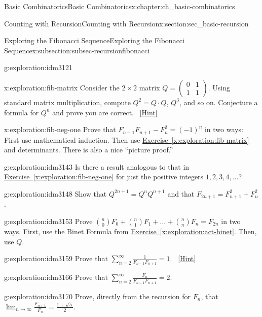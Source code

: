 \documentclass[oneside,10pt,]{book}
\numberwithin{equation}{chapter}
\newcommand{\amp}{&}
\begin{document}
\begin{chapterptx}{Basic Combinatorics}{}{Basic Combinatorics}{}{}{x:chapter:ch_basic-combinatorics}
\begin{sectionptx}{Counting with Recursion}{}{Counting with Recursion}{}{}{x:section:sec_basic-recursion}
\begin{subsectionptx}{Exploring the Fibonacci Sequence}{}{Exploring the Fibonacci Sequence}{}{}{x:subsection:subsec-recursionfibonacci}
\begin{exploration}{}{g:exploration:idm3121}
\end{exploration}
\begin{exploration}{}{x:exploration:fib-matrix}%
Consider the \(2\times 2\) matrix \(Q =
\begin{pmatrix}
0 \amp 1\\
1 \amp 1
\end{pmatrix}.\) Using standard matrix multiplication, compute \(Q^2 = Q\cdot Q\), \(Q^3\), and so on.  Conjecture a formula for \(Q^n\) and prove you are correct.%
\qquad~\hfill{\tiny\hyperlink{g:hint:idm3134-back}{[Hint]}}\end{exploration}
\begin{exploration}{}{x:exploration:fib-neg-one}%
Prove that \(F_{n - 1}F_{n + 1} - F_{n}^{2} = (-1)^{n}\) in two ways:  First use mathematical induction.  Then use \hyperref[x:exploration:fib-matrix]{Exercise~\ref{x:exploration:fib-matrix}} and determinants.  There is also a nice ``picture proof.''%
\end{exploration}
\begin{exploration}{}{g:exploration:idm3143}%
Is there a result analogous to that in \hyperref[x:exploration:fib-neg-one]{Exercise~\ref{x:exploration:fib-neg-one}} for just the positive integers \(1, 2, 3, 4, \ldots\)?%
\end{exploration}
\begin{exploration}{}{g:exploration:idm3148}%
Show that \(Q^{2n + 1} = Q^{n}Q^{n+1}\) and that \(F_{2n + 1} = F_{n + 1}^{2} + F_{n}^{2}\) .%
\end{exploration}
\begin{exploration}{}{g:exploration:idm3153}%
Prove \(\binom{n}{0}F_{0} + \binom{n}{1}F_{1} + \ldots + \binom{n}{n}F_{n} = F_{2n}\) in two ways.  First, use the Binet Formula from \hyperref[x:exploration:act-binet]{Exercise~\ref{x:exploration:act-binet}}.  Then, use \(Q\).%
\end{exploration}
\begin{exploration}{}{g:exploration:idm3159}%
Prove that \(\sum_{n = 2}^{\infty}\frac{1}{F_{n - 1}F_{n + 1}} = 1\).%
\qquad~\hfill{\tiny\hyperlink{g:hint:idm3163-back}{[Hint]}}\end{exploration}
\begin{exploration}{}{g:exploration:idm3166}%
Prove that \(\sum_{n = 2}^{\infty}\frac{F_{n}}{F_{n - 1}F_{n + 1}} = 2.\)%
\end{exploration}
\begin{exploration}{}{g:exploration:idm3170}%
Prove, directly from the recursion for \(F_n\), that \(\lim_{n\to\infty}\frac{F_{n + 1}}{F_{n}} = \frac{1 + \sqrt{5}}{2}.\)%

\end{exploration}
\end{subsectionptx}
\end{sectionptx}
\end{chapterptx}
\end{document}

